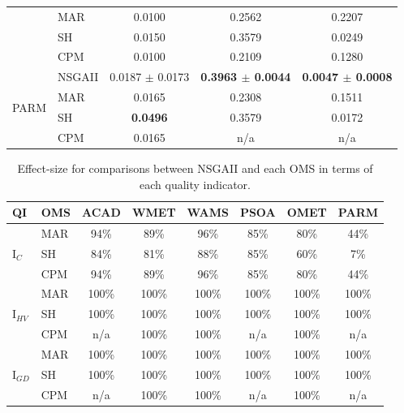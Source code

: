 \documentclass[conference]{IEEEtran}
\begin{document}
\begin{table}[htbp]
\begin{tabular}{p{0.7cm} p{0.7cm} ccc}
          & MAR   & 0.0100 & 0.2562 & 0.2207 \\
          & SH    & 0.0150 & 0.3579 & 0.0249 \\
          & CPM   & 0.0100 & 0.2109 & 0.1280 \\\hline
    \multirow{4}[2]{*}{PARM} & NSGAII & 0.0187 $\pm$ 0.0173 & \textbf{0.3963 $\pm$ 0.0044} & \textbf{0.0047 $\pm$ 0.0008} \\
          & MAR   & 0.0165 & 0.2308 & 0.1511 \\
          & SH    & \textbf{0.0496} & 0.3579 & 0.0172 \\
          & CPM   & 0.0165 & n/a   & n/a \\
    \bottomrule
    \end{tabular}%
\end{table}%

\begin{table}[htbp]
  \scriptsize
	\centering
  \caption{Effect-size for comparisons between NSGAII and each OMS in terms of each quality indicator.}
    \begin{tabular}{llcccccc}
    \toprule
    \textbf{QI} & \textbf{OMS} & \textbf{ACAD} & \textbf{WMET} & \textbf{WAMS} & \textbf{PSOA} & \textbf{OMET} & \textbf{PARM} \\
    \midrule
    \multirow{3}[1]{*}{I$_{C}$} 
		      & MAR   & 94\%  & 89\%  & 96\%  & 85\%  & 80\%  & 44\% \\
          & SH    & 84\%  & 81\%  & 88\%  & 85\%  & 60\%  &  7\% \\
          & CPM   & 94\%  & 89\%  & 96\%  & 85\%  & 80\%  & 44\% \\\hline
    \multirow{3}[2]{*}{I$_{HV}$} 
		      & MAR   & 100\% & 100\% & 100\% & 100\% & 100\% & 100\% \\
          & SH    & 100\% & 100\% & 100\% & 100\% & 100\% & 100\% \\
          & CPM   &   n/a & 100\% & 100\% &   n/a & 100\% &   n/a \\\hline
    \multirow{3}[2]{*}{I$_{GD}$} 
		      & MAR   & 100\% & 100\% & 100\% & 100\% & 100\% & 100\% \\
          & SH    & 100\% & 100\% & 100\% & 100\% & 100\% & 100\% \\
          & CPM   &   n/a & 100\% & 100\% &   n/a & 100\% &   n/a \\
    \bottomrule
    \end{tabular}%
\end{table}%
\end{document}
